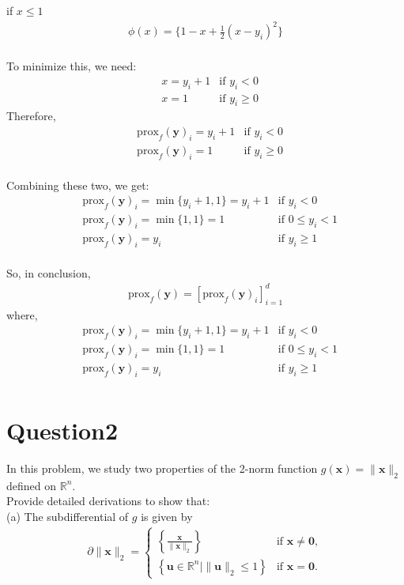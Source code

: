\documentclass{article}
\newcommand{\R}{\mathbb{R}}
\begin{document}
if \(x \leq 1\)
\begin{align*}
    \phi(x) = \{ 1 - x + \frac{1}{2} (x - y_i)^2 \} \\
\end{align*}

To minimize this, we need:
\begin{align*}
    &x = y_i + 1 &\text{if }y_i < 0 \\
    &x = 1 &\text{if }y_i \geq 0
\end{align*}
Therefore, 
\begin{align*}
    &\text{prox}_f(\bm{y})_i = y_i + 1 &\text{if } y_i < 0 \\
    &\text{prox}_f(\bm{y})_i = 1 &\text{if } y_i \geq 0 \\
\end{align*}

\noindent
Combining these two, we get:
\begin{align*}
    &\text{prox}_f(\bm{y})_i = \min\{y_i + 1, 1\} = y_i + 1 &\text{if } y_i < 0 \\
    &\text{prox}_f(\bm{y})_i = \min\{1, 1\} = 1 &\text{if } 0 \leq y_i < 1 \\ 
    &\text{prox}_f(\bm{y})_i = y_i &\text{if } y_i \geq 1 \\
\end{align*}

\noindent
So, in conclusion, 
\begin{align*}
    \text{prox}_f(\bm{y}) = [\text{prox}_f(\bm{y})_i]_{i=1}^{d}
\end{align*}
where,
\begin{align*}
    &\text{prox}_f(\bm{y})_i = \min\{y_i + 1, 1\} = y_i + 1 &\text{if } y_i < 0 \\
    &\text{prox}_f(\bm{y})_i = \min\{1, 1\} = 1 &\text{if } 0 \leq y_i < 1 \\ 
    &\text{prox}_f(\bm{y})_i = y_i &\text{if } y_i \geq 1 \\
\end{align*}






\section*{Question2}
In this problem, we study two properties of the 2-norm function \(g(\bm{x}) = \|\bm{x}\|_2\) defined on \(\R^n\). \\
Provide detailed derivations to show that: \\
\noindent
(a) The subdifferential of \(g\) is given by
\begin{align*}
    \partial \|\bm{x}\|_2 = \begin{cases}
        \left\{ \frac{\bm{x}}{\|\bm{x}\|_2}\right\} &\text{if } \bm{x} \ne \bm{0}, \\
        \left\{ \bm{u} \in \R^n | \|\bm{u}\|_2 \leq 1\right\} &\text{if } \bm{x} = \bm{0}.
    \end{cases}
\end{align*}
\end{document}
